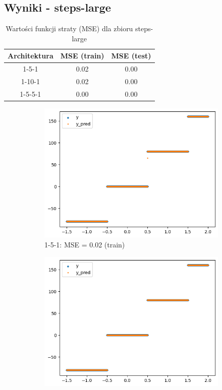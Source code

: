 \documentclass{article}
\begin{document}
\subsection*{Wyniki - steps-large}
\begin{table}[H]
    \centering
    \begin{tabular}{|c|c|c|}
        \hline
        Architektura & MSE (train) & MSE (test) \\
        \hline
        1-5-1 & 0.02 & 0.00 \\
        1-10-1 & 0.02 & 0.00 \\
        1-5-5-1 & 0.00 & 0.00 \\
        \hline
    \end{tabular}
    \caption{Wartości funkcji straty (MSE) dla zbioru steps-large}
\end{table}
\begin{figure}[H]
    \centering
    \begin{subfigure}[b]{0.45\textwidth}
        \centering
        \includegraphics[width=\textwidth]{img/nn1/steps-large_train_1-5-1.png}
        \caption{1-5-1: MSE = 0.02 (train)}
    \end{subfigure}
    \hfill
    \begin{subfigure}[b]{0.45\textwidth}
        \centering
        \includegraphics[width=\textwidth]{img/nn1/steps-large_train_1-5-5-1.png}

\end{subfigure}
\end{figure}
\end{document}
